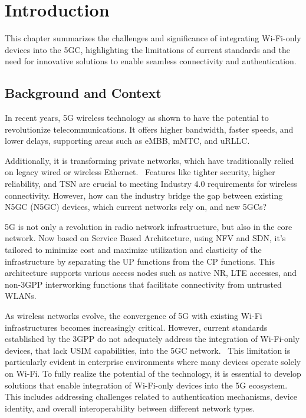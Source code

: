 \chapter{Introduction}%
\label{chapter:introduction}

\begin{introduction}
This chapter summarizes the challenges and significance of integrating Wi-Fi-only devices into the \acl{5GC}, highlighting the limitations of current standards and the need for innovative solutions to enable seamless connectivity and authentication.
\end{introduction}

\section{Background and Context}

In recent years, \ac{5G} wireless technology as shown to have the potential to revolutionize telecommunications. It offers higher bandwidth, faster speeds, and lower delays, supporting areas such as \ac{eMBB}, \ac{mMTC}, and \ac{uRLLC}.

Additionally, it is transforming private networks, which have traditionally relied on legacy wired or wireless Ethernet.~\cite{altice-01-p3} Features like tighter security, higher reliability, and \ac{TSN} are crucial to meeting Industry 4.0 requirements for wireless connectivity. However, how can the industry bridge the gap between existing \acl{N5GC} (\ac{N5GC}) devices, which current networks rely on, and new \acp{5GC}?

\ac{5G} is not only a revolution in radio network infrastructure, but also in the core network. Now based on Service Based Architecture, using \ac{NFV} and \ac{SDN}, it's tailored to minimize cost and maximize utilization and elasticity of the infrastructure by separating the \ac{UP} functions from the \ac{CP} functions. This architecture supports various access nodes such as native \ac{NR}, \ac{LTE} accesses, and non-\ac{3GPP} interworking functions that facilitate connectivity from untrusted \acp{WLAN}.~\cite{23.501-p41}

As wireless networks evolve, the convergence of \ac{5G} with existing Wi-Fi infrastructures becomes increasingly critical. However, current standards established by the \ac{3GPP} do not adequately address the integration of Wi-Fi-only devices, that lack \ac{USIM} capabilities, into the \ac{5GC} network.~\cite{wba-04-2021-p59} This limitation is particularly evident in enterprise environments where many devices operate solely on Wi-Fi. To fully realize the potential of the technology, it is essential to develop solutions that enable integration of Wi-Fi-only devices into the \ac{5G} ecosystem. This includes addressing challenges related to authentication mechanisms, device identity, and overall interoperability between different network types.


